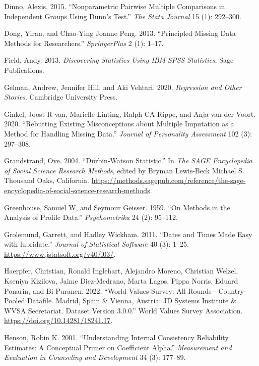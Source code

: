 \documentclass[
  letterpaper,
  DIV=11,
  numbers=noendperiod]{scrreprt}
\newlength{\cslhangindent}
\newenvironment{CSLReferences}[2] %
 {\begin{list}{}{%
  \setlength{\itemindent}{0pt}
  \setlength{\leftmargin}{0pt}
  \setlength{\parsep}{0pt}
  \ifodd #1
   \setlength{\leftmargin}{\cslhangindent}
   \setlength{\itemindent}{-1\cslhangindent}
  \fi
  \setlength{\itemsep}{#2\baselineskip}}}
 {\end{list}}
\begin{document}
\begin{CSLReferences}{1}{0}
Dinno, Alexis. 2015. {``Nonparametric Pairwise Multiple Comparisons in
Independent Groups Using Dunn's Test.''} \emph{The Stata Journal} 15
(1): 292--300.

Dong, Yiran, and Chao-Ying Joanne Peng. 2013. {``Principled Missing Data
Methods for Researchers.''} \emph{SpringerPlus} 2 (1): 1--17.

Field, Andy. 2013. \emph{Discovering Statistics Using IBM SPSS
Statistics}. Sage Publications.

Gelman, Andrew, Jennifer Hill, and Aki Vehtari. 2020. \emph{Regression
and Other Stories}. Cambridge University Press.

Ginkel, Joost R van, Marielle Linting, Ralph CA Rippe, and Anja van der
Voort. 2020. {``Rebutting Existing Misconceptions about Multiple
Imputation as a Method for Handling Missing Data.''} \emph{Journal of
Personality Assessment} 102 (3): 297--308.

Grandstrand, Ove. 2004. {``Durbin-Watson Statistic.''} In \emph{The SAGE
Encyclopedia of Social Science Research Methods}, edited by Bryman
Lewis-Beck Michael S. Thousand Oaks, California.
\url{https://methods.sagepub.com/reference/the-sage-encyclopedia-of-social-science-research-methods}.

Greenhouse, Samuel W, and Seymour Geisser. 1959. {``On Methods in the
Analysis of Profile Data.''} \emph{Psychometrika} 24 (2): 95--112.

Grolemund, Garrett, and Hadley Wickham. 2011. {``Dates and Times Made
Easy with {lubridate}.''} \emph{Journal of Statistical Software} 40 (3):
1--25. \url{https://www.jstatsoft.org/v40/i03/}.

Haerpfer, Christian, Ronald Inglehart, Alejandro Moreno, Christian
Welzel, Kseniya Kizilova, Jaime Diez-Medrano, Marta Lagos, Pippa Norris,
Eduard Ponarin, and Bi Puranen. 2022. {``World Values Survey: All Rounds
- Country-Pooled Datafile. Madrid, Spain \& Vienna, Austria: JD Systems
Institute \& WVSA Secretariat. Dataset Version 3.0.0.''} World Values
Survey Association. \url{https://doi.org/10.14281/18241.17}.

Henson, Robin K. 2001. {``Understanding Internal Consistency Reliability
Estimates: A Conceptual Primer on Coefficient Alpha.''}
\emph{Measurement and Evaluation in Counseling and Development} 34 (3):
177--89.


\end{CSLReferences}
\end{document}
